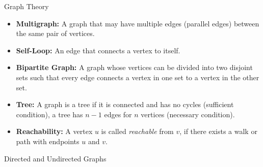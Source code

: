 \begin{terms}[]{Graph Theory}
\begin{itemize}
        \item \textbf{Multigraph:} A graph that may have multiple edges (parallel edges) between the same pair of vertices.
        \item \textbf{Self-Loop:} An edge that connects a vertex to itself.
        \item \textbf{Bipartite Graph:} A graph whose vertices can be divided into two disjoint sets such that every edge connects a vertex in one set to a vertex in the other set.
        \item \textbf{Tree:} A graph is a tree if it is connected and has no cycles (sufficient condition), a tree has $n - 1$ edges for $n$ vertices (necessary condition).
        \item \textbf{Reachability:} A vertex $u$ is called \textit{reachable} from $v$, if there exists a walk or path with endpoints $u$ and $v$.
    \end{itemize}
\end{terms}

\begin{example}[]{Directed and Undirected Graphs}
    \begin{center}
    \end{center}
\end{example}
